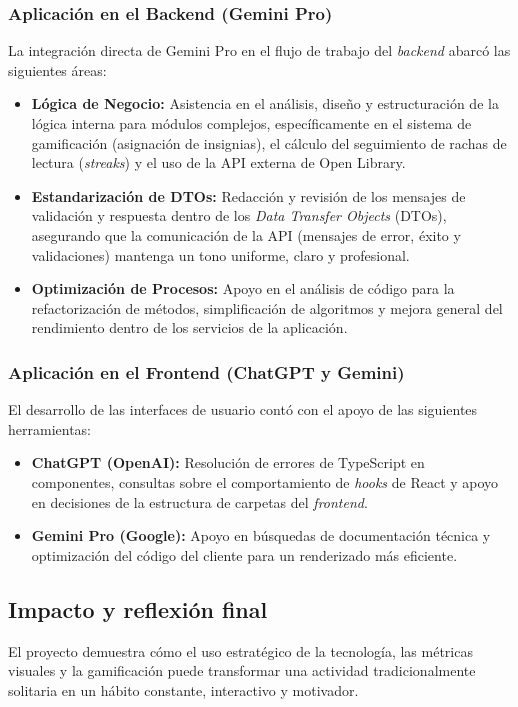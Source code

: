\documentclass[12pt, atypical, journal]{article}
\begin{document}
\subsubsection*{Aplicación en el Backend (Gemini Pro)}
La integración directa de Gemini Pro en el flujo de trabajo del \textit{backend} abarcó las siguientes áreas:
\begin{itemize}
    \item \textbf{Lógica de Negocio:} Asistencia en el análisis, diseño y estructuración de la lógica interna para módulos complejos, específicamente en el sistema de gamificación (asignación de insignias), el cálculo del seguimiento de rachas de lectura (\textit{streaks}) y el uso de la API externa de Open Library.
    \item \textbf{Estandarización de DTOs:} Redacción y revisión de los mensajes de validación y respuesta dentro de los \textit{Data Transfer Objects} (DTOs), asegurando que la comunicación de la API (mensajes de error, éxito y validaciones) mantenga un tono uniforme, claro y profesional.
    \item \textbf{Optimización de Procesos:} Apoyo en el análisis de código para la refactorización de métodos, simplificación de algoritmos y mejora general del rendimiento dentro de los servicios de la aplicación.
\end{itemize}

\subsubsection*{Aplicación en el Frontend (ChatGPT y Gemini)}
El desarrollo de las interfaces de usuario contó con el apoyo de las siguientes herramientas:
\begin{itemize}
    \item \textbf{ChatGPT (OpenAI):} Resolución de errores de TypeScript en componentes, consultas sobre el comportamiento de \textit{hooks} de React y apoyo en decisiones de la estructura de carpetas del \textit{frontend}.
    \item \textbf{Gemini Pro (Google):} Apoyo en búsquedas de documentación técnica y optimización del código del cliente para un renderizado más eficiente.
\end{itemize}

\subsection{Impacto y reflexión final}
El proyecto demuestra cómo el uso estratégico de la tecnología, las métricas visuales y la gamificación puede transformar una actividad tradicionalmente solitaria en un hábito constante, interactivo y motivador.
\end{document}

